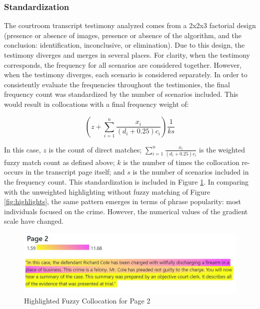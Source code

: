 \documentclass[print]{nuthesis}
\begin{document}
\hypertarget{standardization}{%
\subsubsection{Standardization}\label{standardization}}

The courtroom transcript testimony analyzed comes from a 2x2x3 factorial design (presence or absence of images, presence or absence of the algorithm, and the conclusion: identification, inconclusive, or elimination).
Due to this design, the testimony diverges and merges in several places.
For clarity, when the testimony corresponds, the frequency for all scenarios are considered together.
However, when the testimony diverges, each scenario is considered separately.
In order to consistently evaluate the frequencies throughout the testimonies, the final frequency count was standardized by the number of scenarios included.
This would result in collocations with a final frequency weight of:

\[
(z+\sum_{i=1}^n\frac{x_i}{(d_i+0.25)c_i})\frac{1}{ks}
\]

In this case, \(z\) is the count of direct matches; \(\sum_{i=1}^n\frac{x_i}{(d_i+0.25)c_i}\) is the weighted fuzzy match count as defined above; \(k\) is the number of times the collocation re-occurs in the transcript page itself; and \(s\) is the number of scenarios included in the frequency count.
This standardization is included in Figure \ref{fig:weightedhighlights}.
In comparing with the unweighted highlighting without fuzzy matching of Figure \ref{fig:highlights}, the same pattern emerges in terms of phrase popularity: most individuals focused on the crime.
However, the numerical values of the gradient scale have changed.

\begin{figure}

{\centering \includegraphics[width=\linewidth]{images/weightedcollocationanalysis} 

}

\caption{Highlighted Fuzzy Collocation for Page 2}\label{fig:weightedhighlights}
\end{figure}
\end{document}
